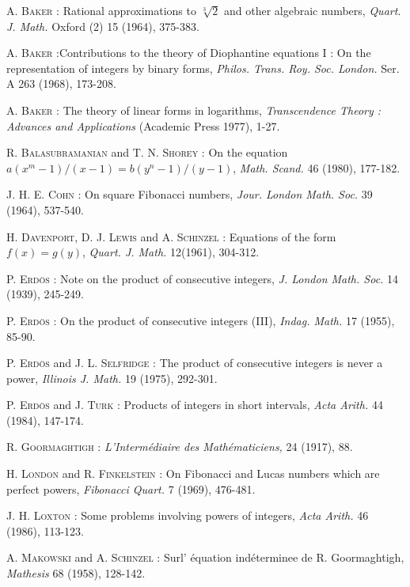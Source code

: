 \begin{thebibliography}{99}
 \textsc{A. Baker :} Rational approximations to $\sqrt[3]{2}$ and other algebraic numbers, {\em Quart. J. Math.} Oxford (2) 15 (1964), 375-383.

 \textsc{A. Baker :}\pageoriginale Contributions to the theory of Diophantine equations I : On the representation of integers by binary forms, {\em Philos. Trans. Roy. Soc. London.} Ser. A 263 (1968), 173-208.

 \textsc{A. Baker :} The theory of linear forms in logarithms, {\em Transcendence Theory : Advances and Applications} (Academic Press 1977), 1-27.

 \textsc{R. Balasubramanian} and \textsc{T. N. Shorey :} On the equation $a(x^{m}-1)/(x-1)=b(y^{n}-1)/(y-1)$, {\em Math. Scand.} 46 (1980), 177-182.

 \textsc{J. H. E. Cohn :} On square Fibonacci numbers, {\em Jour. London Math. Soc.} 39 (1964), 537-540.

 \textsc{H. Davenport, D. J. Lewis} and \textsc{A. Schinzel :} Equations of the form $f(x)=g(y)$, {\em Quart. J. Math.} 12(1961), 304-312.

 \textsc{P. Erd\"os :} Note on the product of consecutive integers, {\em J. London Math. Soc.} 14 (1939), 245-249.

 \textsc{P. Erd\"os :} On the product of consecutive integers (III), {\em Indag. Math.} 17 (1955), 85-90.

 \textsc{P. Erd\"os} and \textsc{J. L. Selfridge :} The product of consecutive integers is never a power, {\em Illinois J. Math.} 19 (1975), 292-301. 

 \textsc{P. Erd\"os} and \textsc{J. Turk :} Products of integers in short intervals, {\em Acta Arith.} 44 (1984), 147-174.

 \textsc{R. Goormaghtigh :} {\em L'Interm\'ediaire des Math\'ematiciens,} 24 (1917), 88.

 \textsc{H. London} and \textsc{R. Finkelstein :} On Fibonacci and Lucas numbers which are perfect powers, {\em Fibonacci Quart.} 7 (1969), 476-481.

 \textsc{J. H. Loxton :} Some problems involving powers of integers, {\em Acta Arith.} 46 (1986), 113-123.

 \textsc{A. Makowski} and \textsc{A. Schinzel :} Surl' \'equation ind\'eterminee de R. Goormaghtigh, {\em Mathesis} 68 (1958), 128-142.


\end{thebibliography}
